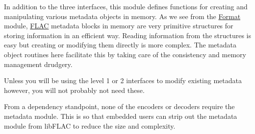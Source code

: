 In addition to the three interfaces, this module defines functions for creating and manipulating various metadata objects in memory. As we see from the \hyperlink{class_format}{Format} module, \hyperlink{namespace_f_l_a_c}{F\+L\+AC} metadata blocks in memory are very primitive structures for storing information in an efficient way. Reading information from the structures is easy but creating or modifying them directly is more complex. The metadata object routines here facilitate this by taking care of the consistency and memory management drudgery.

Unless you will be using the level 1 or 2 interfaces to modify existing metadata however, you will not probably not need these.

From a dependency standpoint, none of the encoders or decoders require the metadata module. This is so that embedded users can strip out the metadata module from lib\+F\+L\+AC to reduce the size and complexity. 
